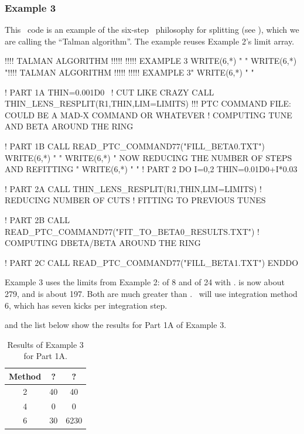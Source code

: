 \subsubsection*{Example 3}

%
This \PTC\ code is an example of the six-step \PTC\ philosophy for splitting
(see ), which we are calling the ``Talman algorithm''.
The example reuses Example 2's limit array.


\begin{ptccode}
!!!! TALMAN ALGORITHM !!!!! !!!!!  EXAMPLE 3
WRITE(6,*) "  "
WRITE(6,*) "!!!! TALMAN ALGORITHM !!!!! !!!!!  EXAMPLE 3"
WRITE(6,*) "  "

! PART 1A
THIN=0.001D0  ~! CUT LIKE CRAZY
CALL THIN_LENS_RESPLIT(R1,THIN,LIM=LIMITS)
!!! PTC COMMAND FILE: COULD BE A MAD-X COMMAND OR WHATEVER
! COMPUTING TUNE AND BETA AROUND THE RING

! PART 1B
CALL READ_PTC_COMMAND77("FILL_BETA0.TXT")
WRITE(6,*) "  "
WRITE(6,*) " NOW REDUCING THE NUMBER OF STEPS AND REFITTING "
WRITE(6,*) "  "
! PART 2
DO I=0,2
THIN=0.01D0+I*0.03

! PART 2A
CALL THIN_LENS_RESPLIT(R1,THIN,LIM=LIMITS) ! REDUCING NUMBER OF CUTS
! FITTING TO PREVIOUS TUNES

! PART 2B
CALL READ_PTC_COMMAND77("FIT_TO_BETA0_RESULTS.TXT")
! COMPUTING DBETA/BETA AROUND THE RING

! PART 2C
CALL READ_PTC_COMMAND77("FILL_BETA1.TXT")
ENDDO
\end{ptccode}

Example 3 uses the limits from Example 2:  of 8 and  of 24 with
.  is now about 279, and  is about 197.
Both are much greater than . \PTC\ will use integration method 6, which has 
seven kicks per integration step.

 and the list below show the results for Part 1A of Example 3.

\begin{table}[htbp]
\caption{Results of Example 3 for Part 1A.}
\label{tbl:Results-Example-3}
\begin{center}
\begin{tabular}{ccc} \toprule
  Method & ?  & ? \\ \midrule
    2    & 40 & 40 \\
    4    &  0 &  0 \\
    6    & 30 & 6230 \\ \bottomrule
\end{tabular}
\end{center}
\end{table}

